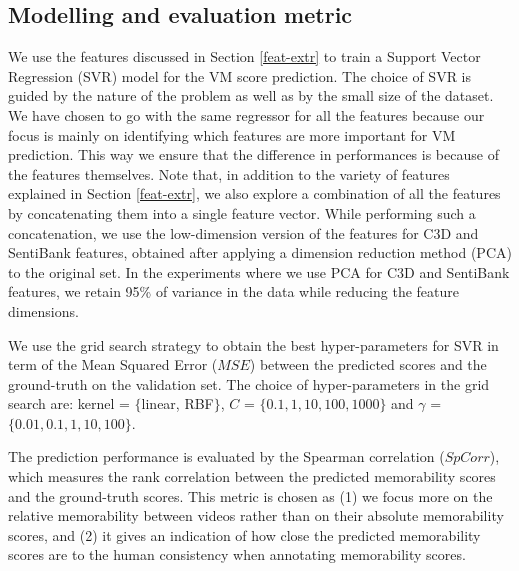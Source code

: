 \documentclass[sigconf]{acmart}
\begin{document}
\subsection{Modelling and evaluation metric}
\label{model-eval}
We use the features discussed in Section \ref{feat-extr} to train a Support Vector Regression (SVR) model for the VM score prediction. The choice of SVR is guided by the nature of the problem as well as by the small size of the dataset. We have chosen to go with the same regressor for all the features because our focus is mainly on identifying which features are more important for VM prediction. This way we ensure that the difference in performances is because of the features themselves. Note that, in addition to the variety of features explained in Section \ref{feat-extr}, we also explore a combination of all the features by concatenating them into a single feature vector.
While performing such a concatenation, we use the low-dimension version of the features for C3D and SentiBank features, obtained after applying a dimension reduction method (PCA) to the original set. In the experiments where we use PCA for C3D and SentiBank features, we retain 95\% of variance in the data while reducing the feature dimensions. 

We use the grid search strategy to obtain the best hyper-parameters for SVR in term of the Mean Squared Error ($MSE$) between the predicted scores and the ground-truth on the validation set. The choice of hyper-parameters in the grid search are: kernel = $\{$linear, RBF$\}$, $C$ = $\{0.1, 1, 10, 100, 1000\}$ and $\gamma$ = $\{0.01, 0.1, 1, 10, 100\}$.

The prediction performance is evaluated by the Spearman correlation ($SpCorr$), which measures the rank correlation between the predicted memorability scores and the ground-truth scores. This metric is chosen as (1) we focus more on the relative memorability between videos rather than on  their absolute memorability scores, and (2) it gives an indication of how close the predicted memorability scores are to the human consistency when annotating memorability scores.


\end{document}
